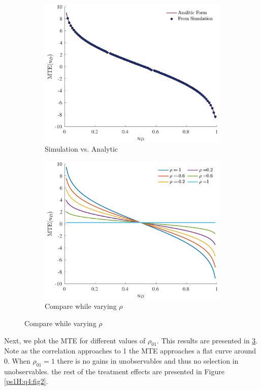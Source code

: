 \documentclass{article}
\begin{document}
\begin{solution}
\begin{figure}[htb]
\begin{subfigure}[b]{0.43\textwidth}
         \includegraphics[width=\textwidth]{ps1Heckman/Figures/MTEcompare.pdf}
         \caption{Simulation vs. Analytic}
         \label{ps1H:q4:fig1a}
     \end{subfigure}
     \begin{subfigure}[b]{0.43\textwidth}
         \centering
         \includegraphics[width=\textwidth]{ps1Heckman/Figures/MTEgrid.pdf}
         \caption{Compare while varying $\rho$}
         \label{ps1H:q4:fig1b}
     \end{subfigure}
\end{figure}
\FloatBarrier
Next, we plot the MTE for different values of $\rho_{01}$. This results are presented in \ref{ps1H:q4:fig1b}. Note as the correlation approaches to 1 the MTE approaches a flat curve around 0. When $\rho_{01}=1$ there is no gains in unobservables and thus no selection in unobservables. the rest of the treatment effects are presented in Figure \ref{ps1H:q4:fig2}. 
\end{solution}
\end{document}
